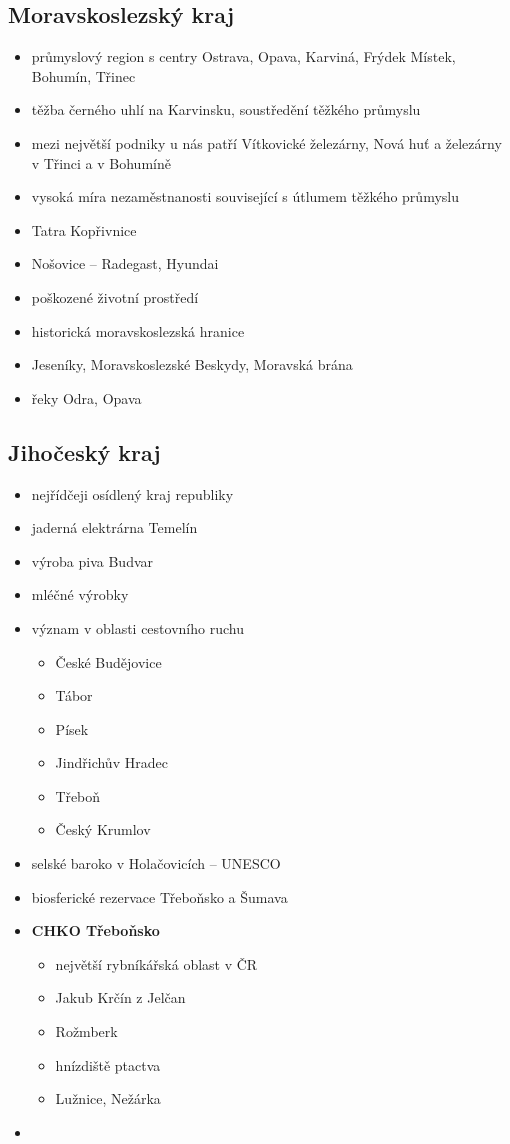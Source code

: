 \subsection{Moravskoslezský kraj}
\begin{itemize}
\item průmyslový region s centry Ostrava, Opava, Karviná, Frýdek Místek, Bohumín, Třinec
\item těžba černého uhlí na Karvinsku, soustředění těžkého průmyslu
\item mezi největší podniky u nás patří Vítkovické železárny, Nová huť a železárny v Třinci a v  Bohumíně
\item vysoká míra nezaměstnanosti související s útlumem těžkého průmyslu
\item Tatra Kopřivnice
\item Nošovice -- Radegast, Hyundai
\item poškozené životní prostředí
\item historická moravskoslezská hranice
\item Jeseníky, Moravskoslezské Beskydy, Moravská brána
\item řeky Odra, Opava
\end{itemize}

\subsection{Jihočeský kraj}
\begin{itemize}
\item nejřídčeji osídlený kraj republiky
\item jaderná elektrárna Temelín
\item výroba piva Budvar
\item mléčné výrobky
\item význam v oblasti cestovního ruchu
	\begin{itemize}
	\item České Budějovice
	\item Tábor
	\item Písek
	\item Jindřichův Hradec
	\item Třeboň
	\item Český Krumlov
	\end{itemize}
\item selské baroko v Holačovicích -- UNESCO
\item biosferické rezervace Třeboňsko a Šumava
\item \textbf{CHKO Třeboňsko}
	\begin{itemize}
	\item největší rybníkářská oblast v ČR
	\item Jakub Krčín z Jelčan
	\item Rožmberk
	\item hnízdiště ptactva
	\item Lužnice, Nežárka
	\end{itemize}
\item 
\end{itemize}

